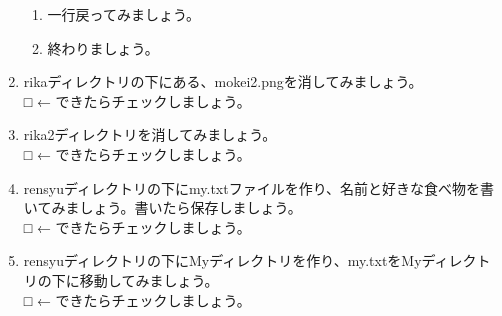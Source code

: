 \begin{tcolorbox}[title=\useOmetoi,breakable]
\begin{enumerate}
\begin{enumerate}
	\item 一行戻ってみましょう。
	\item 終わりましょう。
	\end{enumerate}
\item rikaディレクトリの下にある、mokei2.pngを消してみましょう。\\
□ ← できたらチェックしましょう。
\item rika2ディレクトリを消してみましょう。\\
□ ← できたらチェックしましょう。
\item rensyuディレクトリの下にmy.txtファイルを作り、名前と好きな食べ物を書いてみましょう。書いたら保存しましょう。\\
□ ← できたらチェックしましょう。
\item rensyuディレクトリの下にMyディレクトリを作り、my.txtをMyディレクトリの下に移動してみましょう。\\
□ ← できたらチェックしましょう。
\end{enumerate}
\end{tcolorbox}
